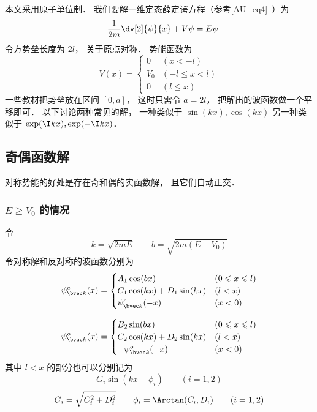 


本文采用原子单位制． 我们要解一维定态薛定谔方程（参考\autoref{AU_eq4}~）为
\begin{equation}
-\frac{1}{2m} \dv[2]{\psi}{x} + V\psi= E \psi
\end{equation}
令方势垒长度为 $2l$， 关于原点对称． 势能函数为
\begin{equation}
V(x) =
\begin{cases}
0 & (x < -l)\\
V_0 & (-l \leqslant x < l)\\
0 & (l \leqslant x)
\end{cases}
\end{equation}
一些教材把势垒放在区间 $[0, a]$， 这时只需令 $a = 2l$， 把解出的波函数做一个平移即可． 以下讨论两种常见的解， 一种类似于 $\sin(kx), \cos(kx)$ 另一种类似于 $\exp(\I kx), \exp(-\I kx)$．

\subsection{奇偶函数解}
对称势能的好处是存在奇和偶的实函数解， 且它们自动正交．
\subsubsection{$E \ge V_0$ 的情况}
令
\begin{equation}
k = \sqrt{2mE}
\qquad
b = \sqrt{2m(E-V_0)}
\end{equation}
令对称解和反对称的波函数分别为
\begin{equation}
\psi_{\bvec k}^e(x) =
\begin{cases}
A_1 \cos(bx) & (0 \leqslant x \leqslant l)\\
C_1 \cos(kx) + D_1 \sin(kx) & (l < x)\\
\psi_{\bvec k}^e(-x) & (x < 0)
\end{cases}
\end{equation}

\begin{equation}
\psi_{\bvec k}^o(x) =
\begin{cases}
B_2 \sin(bx) & (0 \leqslant x \leqslant l)\\
C_2 \cos(kx) + D_2 \sin(kx) & (l < x)\\
-\psi_{\bvec k}^o(-x) & (x < 0)
\end{cases}
\end{equation}
其中 $l < x$ 的部分也可以分别记为
\begin{equation}
G_i \sin(kx + \phi_i) \qquad (i = 1,2)
\end{equation}
\begin{equation}
G_i = \sqrt{C_i^2 + D_i^2}
\qquad
\phi_i = \Arctan(C_i, D_i)
\qquad
(i = 1,2)
\end{equation}


